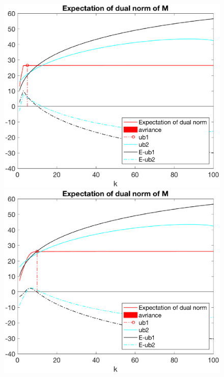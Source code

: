 \documentclass[12pt]{article}
\begin{document}
\begin{figure}[h]
    \begin{minipage}[c]{.4\linewidth}
        \centering
        \includegraphics[width=\linewidth]{Fig/dualnorm-u0rand-k0-5-minusnoise.eps}
    \end{minipage}
    \hfill%
    \begin{minipage}[c]{.4\linewidth}
        \centering
        \includegraphics[width=\linewidth]{Fig/dualnorm-u0rand-k0-10-minusnoise.eps}
    \end{minipage}
\end{figure}
\end{document}
